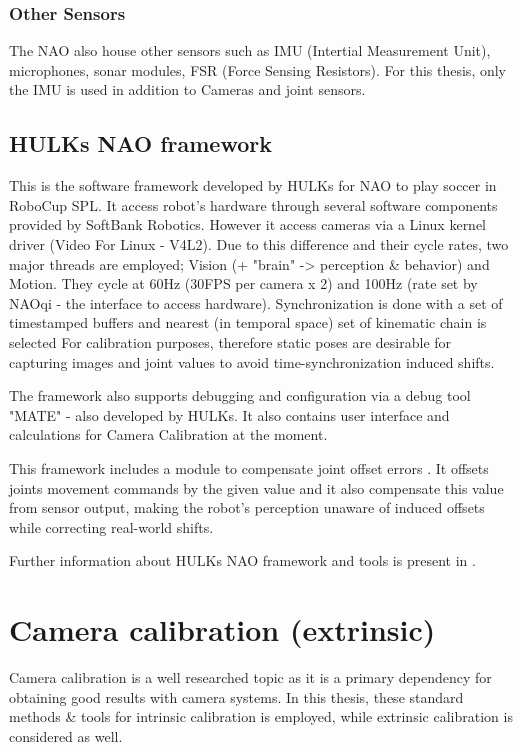 \documentclass[english, printversion, nomenclature, notitle]{tuvisionthesis} %
\begin{document}
\subsubsection{Other Sensors}
The NAO also house other sensors such as IMU (Intertial Measurement Unit), microphones, sonar modules, FSR (Force Sensing Resistors). For this thesis, only the IMU is used in addition to Cameras and joint sensors.

\subsection{HULKs NAO framework}
This is the software framework developed by HULKs for NAO to play soccer in RoboCup SPL. It access robot's hardware through several software components provided by SoftBank Robotics. However it access cameras via a Linux kernel driver (Video For Linux - V4L2). Due to this difference and their cycle rates, two major threads are employed; Vision (+ "brain" -> perception \& behavior)  and Motion. They cycle at 60Hz (30FPS per camera x 2) and 100Hz (rate set by NAOqi - the interface to access hardware). Synchronization is done with a set of timestamped buffers and nearest (in temporal space) set of kinematic chain is selected For calibration purposes, therefore static poses are desirable for capturing images and joint values to avoid time-synchronization induced shifts.

The framework also supports debugging and configuration via a debug tool "MATE" - also developed by HULKs. It also contains user interface and calculations for Camera Calibration at the moment.

This framework includes a module to compensate joint offset errors . It offsets joints movement commands by the given value and it also compensate this value from sensor output, making the robot's perception unaware of induced offsets while correcting real-world shifts. 

Further information about HULKs NAO framework and tools is present in \cite{darshana_adikari_team_2017}.

\section{Camera calibration (extrinsic)}

Camera calibration is a well researched topic as it is a primary dependency for obtaining good results with camera systems. In this thesis, these standard methods \& tools for intrinsic calibration is employed, while extrinsic calibration is considered as well.
\end{document}
